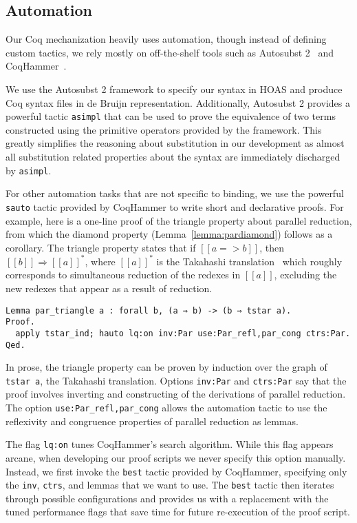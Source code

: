 \documentclass[acmsmall,screen=true,
\ifpublic review=false\else,review=true\fi
  ,anonymous=\ifanonymous true\else false\fi]{acmart}
\begin{document}
\subsection{Automation}
\label{sec:automation}
Our Coq mechanization heavily uses automation, though instead of
defining custom tactics, we rely mostly on off-the-shelf tools such as
Autosubst 2~\citep{autosubst2} and CoqHammer~\citep{czajka2018hammer}.

We use the Autosubst 2 framework to specify our syntax in HOAS and
produce Coq syntax files in de Bruijn representation. Additionally,
Autosubst 2 provides a powerful tactic \texttt{asimpl} that
can be used to prove the equivalence of two terms constructed using
the primitive operators provided by the framework. This greatly
simplifies the reasoning about substitution in our development as
almost all substitution related properties about the syntax are
immediately discharged by \texttt{asimpl}.

For other automation tasks that are not specific to binding, we use
the powerful \texttt{sauto} tactic provided by CoqHammer to write
short and declarative proofs. For example, here is a one-line proof of
the triangle property about parallel reduction, from which the diamond
property (Lemma~\ref{lemma:pardiamond}) follows as a corollary.
The triangle property states
that if $[[a => b]]$, then $[[b]]\Rightarrow [[a]]^*$, where $[[a]]^*$
is the Takahashi translation~\citep{takahashi-parallel-reduction}
which roughly corresponds to simultaneous reduction of the redexes in
$[[a]]$, excluding the new redexes that appear as a result of
reduction.
\begin{verbatim}
Lemma par_triangle a : forall b, (a ⇒ b) -> (b ⇒ tstar a).
Proof.
  apply tstar_ind; hauto lq:on inv:Par use:Par_refl,par_cong ctrs:Par.
Qed.
\end{verbatim}
In prose, the triangle property can be proven by induction over the graph of
\texttt{tstar a}, the Takahashi translation. Options \texttt{inv:Par}
and \texttt{ctrs:Par} say that the proof involves inverting and constructing
of the derivations of parallel reduction. The option
\texttt{use:Par\_refl,par\_cong} allows the automation tactic to use the
reflexivity and congruence properties of parallel reduction as lemmas.

The flag \texttt{lq:on} tunes CoqHammer's search algorithm.  While this flag
appears arcane, when developing our proof scripts we never specify this option
manually. Instead, we first invoke the \texttt{best} tactic provided by
CoqHammer, specifying only the \texttt{inv}, \texttt{ctrs}, and lemmas that we
want to use. The \texttt{best} tactic then iterates through possible
configurations and provides us with a replacement with the tuned performance
flags that save time for future re-execution of the proof script.
\end{document}

